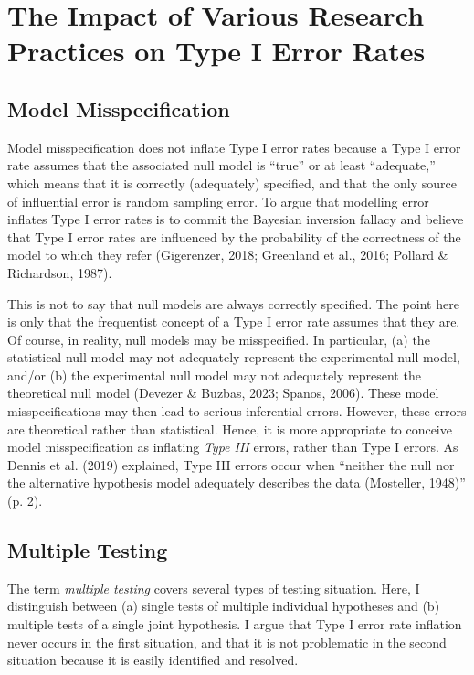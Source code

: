 \documentclass[authordate, empirical]{jote-new-article}
\begin{document}
	\section{The Impact of Various Research Practices on Type I Error Rates}



	\subsection{Model Misspecification}



	Model misspecification does not inflate Type I error rates because a Type I error rate assumes that the associated null model is “true” or at least “adequate,” which means that it is correctly (adequately) specified, and that the only source of influential error is random sampling error. To argue that modelling error inflates Type I error rates is to commit the Bayesian inversion fallacy and believe that Type I error rates are influenced by the probability of the correctness of the model to which they refer (Gigerenzer, 2018; Greenland et al., 2016; Pollard \& Richardson, 1987).



	This is not to say that null models are always correctly specified. The point here is only that the frequentist concept of a Type I error rate assumes that they are. Of course, in reality, null models may be misspecified. In particular, (a) the statistical null model may not adequately represent the experimental null model, and/or (b) the experimental null model may not adequately represent the theoretical null model (Devezer \& Buzbas, 2023; Spanos, 2006). These model misspecifications may then lead to serious inferential errors. However, these errors are theoretical rather than statistical. Hence, it is more appropriate to conceive model misspecification as inflating \emph{Type III} errors, rather than Type I errors. As Dennis et al. (2019) explained, Type III errors occur when “neither the null nor the alternative hypothesis model adequately describes the data (Mosteller, 1948)” (p. 2).



	\subsection{Multiple Testing}



	The term \emph{multiple testing} covers several types of testing situation. Here, I distinguish between (a) single tests of multiple individual hypotheses and (b) multiple tests of a single joint hypothesis. I argue that Type I error rate inflation never occurs in the first situation, and that it is not problematic in the second situation because it is easily identified and resolved.
\end{document}
